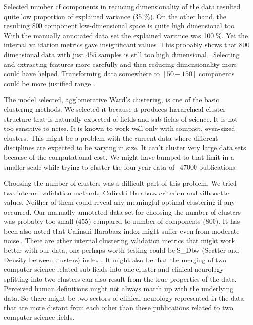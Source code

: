 Selected number of components in reducing dimensionality of the 
data resulted quite low proportion of explained variance (35 \%).
On the other hand, the resulting $800$ component low-dimensional
space is quite high dimensional too.
With the manually annotated data set the explained variance was 
100 \%. Yet the internal validation metrics gave insignificant 
values. This probably shows that $800$ dimensional data with just 
$455$ samples is still too high dimensional \cite{aggarwal_surprising_2001}. 
Selecting and extracting features more carefully and then reducing
dimensionality more could have helped.
Transforming data somewhere to $[50-150]$ components could be more
justified range \cite{dolnicar_review_2002}. 

The model selected, agglomerative Ward's clustering, is one of the
basic clustering methods. We selected it because it produces 
hierarchical cluster structure that is naturally expected of fields
and sub fields of science. It is not too sensitive to noise.
It is known to work well only with compact, even-sized clusters.
This might be a problem with the current data where different 
disciplines are expected to be varying in size.
It can't cluster very large data sets because of the computational
cost. We might have bumped to that limit in a smaller scale while 
trying to cluster the four year data of ~47000 publications.

Choosing the number of clusters was a difficult part of this 
problem. We tried two internal validation methods,
Calinski-Harabasz criterion and silhouette values. Neither of them
could reveal any meaningful optimal clustering if any occurred.
Our manually annotated data set for choosing the number of clusters
was probably too small ($455$) compared to number of components 
($800$). 
It has been also noted that Calinski-Harabasz index 
might suffer even from moderate noise \cite{liu_understanding_2010}.
There are other internal clustering validation metrics that might 
work better with our data, one perhaps worth testing could be
S\_Dbw (Scatter and Density between clusters) index 
\cite{halkidi_clustering_2001}. 
It might also be that the merging of two computer science related 
sub fields into one cluster and clinical neurology splitting into 
two clusters can also result from the true properties of the data.
Perceived human definitions might not always match up with the 
underlying data. So there might be two sectors of clinical 
neurology represented in the data that are more distant from each 
other than these publications related to two computer science fields.


